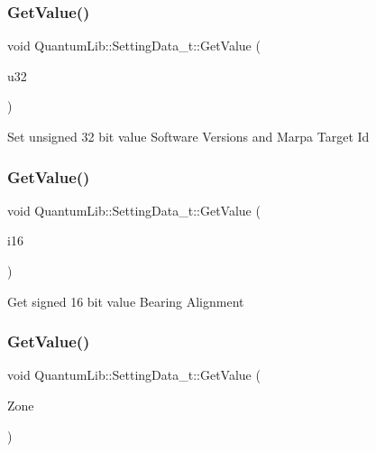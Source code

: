 \subsubsection{\texorpdfstring{Get\+Value()}{GetValue()}\hspace{0.1cm}{\footnotesize\ttfamily [4/26]}}
{\footnotesize\ttfamily void Quantum\+Lib\+::\+Setting\+Data\+\_\+t\+::\+Get\+Value (\begin{DoxyParamCaption}\item[{uint32\+\_\+t \&}]{u32 }\end{DoxyParamCaption})\hspace{0.3cm}{\ttfamily [inline]}}

Set unsigned 32 bit value Software Versions and Marpa Target Id \mbox{\label{struct_quantum_lib_1_1_setting_data__t_adc022298ee04cd323b3eda801c88790a}} 
\subsubsection{\texorpdfstring{Get\+Value()}{GetValue()}\hspace{0.1cm}{\footnotesize\ttfamily [5/26]}}
{\footnotesize\ttfamily void Quantum\+Lib\+::\+Setting\+Data\+\_\+t\+::\+Get\+Value (\begin{DoxyParamCaption}\item[{int16\+\_\+t \&}]{i16 }\end{DoxyParamCaption})\hspace{0.3cm}{\ttfamily [inline]}}

Get signed 16 bit value Bearing Alignment \mbox{\label{struct_quantum_lib_1_1_setting_data__t_ac1eebb9cc1e21cc026715073940248f4}} 
\subsubsection{\texorpdfstring{Get\+Value()}{GetValue()}\hspace{0.1cm}{\footnotesize\ttfamily [6/26]}}
{\footnotesize\ttfamily void Quantum\+Lib\+::\+Setting\+Data\+\_\+t\+::\+Get\+Value (\begin{DoxyParamCaption}\item[{\mbox{\hyperlink{struct_quantum_lib_1_1_zone__t}{Zone\+\_\+t}} \&}]{Zone }\end{DoxyParamCaption})\hspace{0.3cm}{\ttfamily [inline]}}

